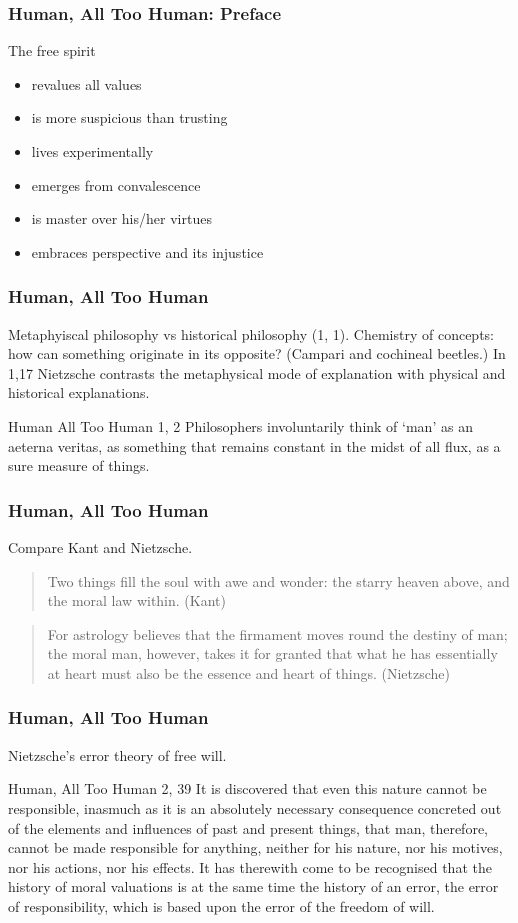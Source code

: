 \documentclass[xcolor=dvipsnames]{beamer}
\begin{document}
\begin{frame}
  \frametitle{Human, All Too Human: Preface}
  The free spirit
  \begin{itemize}
  \item revalues all values
  \item is more suspicious than trusting
  \item lives experimentally
  \item emerges from convalescence
  \item is master over his/her virtues
  \item embraces perspective and its injustice
  \end{itemize}
\end{frame}

\begin{frame}
  \frametitle{Human, All Too Human}
  Metaphyiscal philosophy vs historical philosophy (1, 1). Chemistry of
  concepts: how can something originate in its opposite? (Campari and
  cochineal beetles.) In 1,17 Nietzsche contrasts the metaphysical
  mode of explanation with physical and historical explanations.
  \begin{block}{Human All Too Human 1, 2}
    Philosophers involuntarily think of `man' as an aeterna veritas,
    as something that remains constant in the midst of all flux, as a
    sure measure of things.
  \end{block}
\end{frame}

\begin{frame}
  \frametitle{Human, All Too Human}
  Compare Kant and Nietzsche.
  \begin{quote}
    Two things fill the soul with awe and wonder: the starry heaven
    above, and the moral law within. (Kant)
  \end{quote}
  \begin{quote}
    For astrology believes that the firmament moves round the destiny
    of man; the moral man, however, takes it for granted that what he
    has essentially at heart must also be the essence and heart of
    things. (Nietzsche)
  \end{quote}
\end{frame}

\begin{frame}
  \frametitle{Human, All Too Human}
  Nietzsche's error theory of free will.
  \begin{block}{Human, All Too Human 2, 39}
    It is discovered that even this nature cannot be responsible,
    inasmuch as it is an absolutely necessary consequence concreted
    out of the elements and influences of past and present things,
    that man, therefore, cannot be made responsible for anything,
    neither for his nature, nor his motives, nor his actions, nor his
    effects. It has therewith come to be recognised that the history
    of moral valuations is at the same time the history of an error,
    the error of responsibility, which is based upon the error of the
    freedom of will.
  \end{block}
\end{frame}
\end{document}
